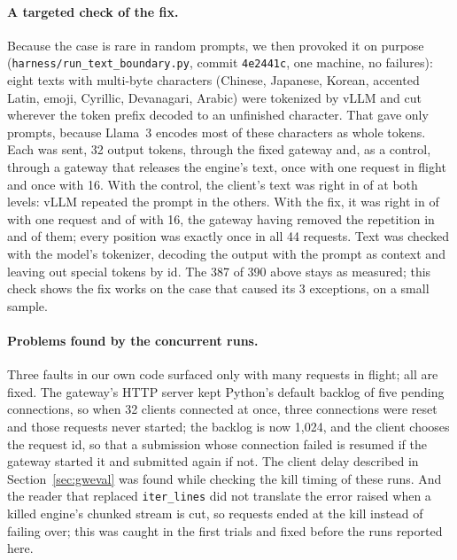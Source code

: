 \documentclass[10pt,twocolumn]{article}
\begin{document}
\paragraph{A targeted check of the fix.} Because the case is rare in random
prompts, we then provoked it on purpose (\texttt{harness/run\_text\_boundary.py},
commit \texttt{4e2441c}, one machine, no failures): eight texts with
multi-byte characters (Chinese, Japanese, Korean, accented Latin, emoji,
Cyrillic, Devanagari, Arabic) were tokenized by vLLM and cut wherever the
token prefix decoded to an unfinished character. That gave only \TbPrompts{}
prompts, because Llama~3 encodes most of these characters as whole tokens.
Each was sent, 32 output tokens, through the fixed gateway and, as a control,
through a gateway that releases the engine's text, once with one request in
flight and once with 16. With the control, the client's text was right in
\TbEngineOneOk{} of \TbPrompts{} at both levels: vLLM repeated the prompt in
the others. With the fix, it was right in \TbDeriveOneOk{} of \TbPrompts{}
with one request and \TbDeriveSixteenOk{} of \TbPrompts{} with 16, the gateway
having removed the repetition in \TbDeriveOneRemoved{} and
\TbDeriveSixteenRemoved{} of them; every position was exactly once in all 44
requests. Text was checked with the model's tokenizer, decoding the output
with the prompt as context and leaving out special tokens by id. The 387 of
390 above stays as measured; this check shows the fix works on the case that
caused its 3 exceptions, on a small sample.

\paragraph{Problems found by the concurrent runs.} Three faults in our own
code surfaced only with many requests in flight; all are fixed. The gateway's HTTP server kept Python's default
backlog of five pending connections, so when 32 clients connected at once,
three connections were reset and those requests never started; the backlog
is now 1{,}024, and the client chooses the request id, so that a submission
whose connection failed is resumed if the gateway started it and submitted
again if not. The client delay described in Section~\ref{sec:gweval} was
found while checking the kill timing of these runs. And the reader that
replaced \texttt{iter\_lines} did not translate the error raised when a
killed engine's chunked stream is cut, so requests ended at the kill instead
of failing over; this was caught in the first trials and fixed before the
runs reported here.
\end{document}
